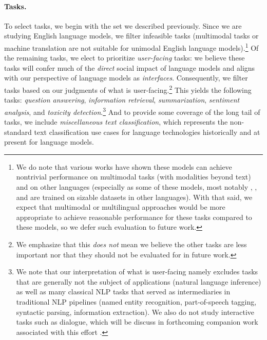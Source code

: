 \paragraph{Tasks.}
To select tasks, we begin with the set we described previously.
Since we are studying English language models, we filter infeasible tasks (\eg multimodal tasks or machine translation are not suitable for unimodal English language models).\footnote{We do note that various works have shown these models can achieve nontrivial performance on multimodal tasks (with modalities beyond text) and on other languages (especially as some of these models, most notably \bloom, \glm, and \yalm are trained on sizable datasets in other languages). With that said, we expect that multimodal or multilingual approaches would be more appropriate to achieve reasonable performance for these tasks compared to these models, so we defer such evaluation to future work.}
Of the remaining tasks, we elect to prioritize \textit{user-facing} tasks: we believe these tasks will confer much of the \textit{direct} social impact of language models and aligns with our perspective of language models as \textit{interfaces}. 
Consequently, we filter tasks based on our judgments of what is user-facing.\footnote{We emphasize that this \textit{does not} mean we believe the other tasks are less important nor that they should not be evaluated for in future work.}
This yields the following tasks: 
\textit{question answering}, 
\textit{information retrieval}, 
\textit{summarization}, 
\textit{sentiment analysis}, 
and \textit{toxicity detection}.\footnote{We note that our interpretation of what is user-facing namely excludes tasks that are generally not the subject of applications (\eg natural language inference) as well as many classical NLP tasks that served as intermediaries \citep{jurafsky2000speech} in traditional NLP pipelines (\eg named entity recognition, part-of-speech tagging, syntactic parsing, information extraction). We also do not study interactive tasks such as dialogue, which will be discuss in forthcoming companion work associated with this effort \citep{lee2022interaction}.}
And to provide some coverage of the long tail of tasks, we include \textit{miscellaneous text classification}, which represents the non-standard text classification use cases for language technologies historically and at present for language models. 

